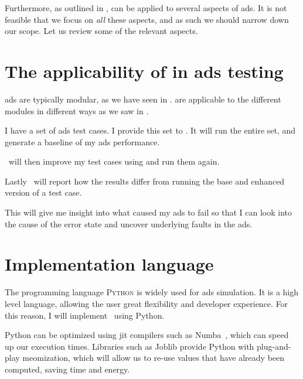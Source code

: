 Furthermore, as outlined in \citeauthor{LLM4AD},  can be applied to several aspects
of \acrlong{ads}. It is not feasible that we focus on \textit{all} these aspects, and as such we
should narrow down our scope. Let us review some of the relevant aspects.

\section*{The applicability of  in \acrshort{ads} testing}

\acrlong{ads} are typically modular, as we have seen in .
 are applicable to the different modules in different ways as we saw in
.

\begin{tcolorbox}[colback=gray!5!white,colframe=gray!75!black,title=User history
        of using \hefe]\label{user-history}
    I have a set of \acrfull{ads} test cases. I provide this set to \hefe. It will run the entire
    set, and generate a baseline of my \acrshort{ads} performance.

    \hefe~will then improve my test cases using  and run them again.

    Lastly \hefe~will report how the results differ from running the base and enhanced version of a
    test case.

    This will give me insight into what caused my \acrshort{ads} to fail so that I can look into the
    cause of the error state and uncover underlying faults in the \acrlong{ads}.

\end{tcolorbox}


\section{Implementation language}

The programming language \textsc{Python} is widely used for \acrfull{ads} simulation. It is a high
level language, allowing the user great flexibility and developer experience. For this reason, I will
implement \hefe~using Python.

Python can be optimized using \acrfull{jit} compilers such as Numba~\cite{numba}, which can speed up
our execution times. Libraries such as Joblib provide Python with plug-and-play
meomization, which will allow us to re-use values that have already been
computed, saving time and energy.

